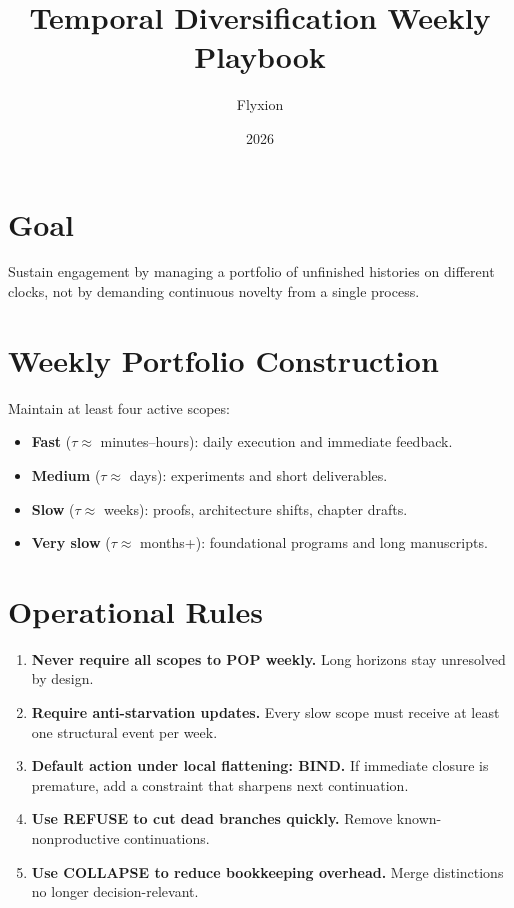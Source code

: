 \documentclass[11pt]{article}
\title{Temporal Diversification Weekly Playbook}
\author{Flyxion}
\date{2026}
\begin{document}
\maketitle

\section{Goal}

Sustain engagement by managing a portfolio of unfinished histories on different clocks,
not by demanding continuous novelty from a single process.

\section{Weekly Portfolio Construction}

Maintain at least four active scopes:
\begin{itemize}[leftmargin=*]
  \item \textbf{Fast} ($\tau\approx$ minutes--hours): daily execution and immediate feedback.
  \item \textbf{Medium} ($\tau\approx$ days): experiments and short deliverables.
  \item \textbf{Slow} ($\tau\approx$ weeks): proofs, architecture shifts, chapter drafts.
  \item \textbf{Very slow} ($\tau\approx$ months+): foundational programs and long manuscripts.
\end{itemize}

\section{Operational Rules}

\begin{enumerate}[leftmargin=*]
  \item \textbf{Never require all scopes to POP weekly.} Long horizons stay unresolved by design.
  \item \textbf{Require anti-starvation updates.} Every slow scope must receive at least one
  structural event per week.
  \item \textbf{Default action under local flattening: BIND.} If immediate closure is premature,
  add a constraint that sharpens next continuation.
  \item \textbf{Use REFUSE to cut dead branches quickly.} Remove known-nonproductive continuations.
  \item \textbf{Use COLLAPSE to reduce bookkeeping overhead.} Merge distinctions no longer
  decision-relevant.
\end{enumerate}
\end{document}
